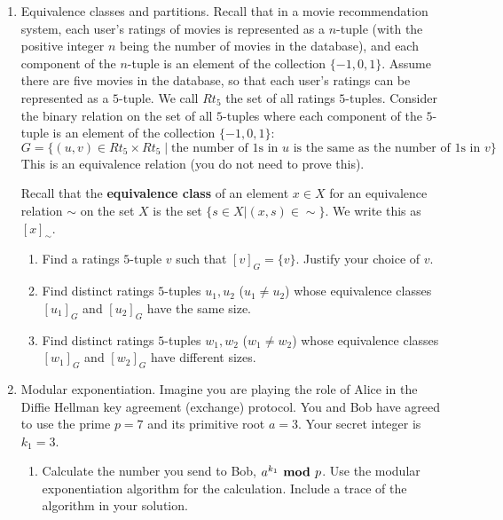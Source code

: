 \documentclass[12pt, oneside]{article}
\begin{document}
\begin{enumerate}[labelindent=0pt, leftmargin=0pt]
    \item Equivalence classes and partitions. 
    Recall that 
    in a movie recommendation system, each 
    user's ratings of movies is represented as a $n$-tuple (with the positive integer $n$ 
    being the number of movies in the database), and each component of 
    the $n$-tuple is an element of the collection $\{-1,0,1\}$. Assume there are five movies in the database, 
    so that each user's ratings
    can be represented as a $5$-tuple. We call $Rt_5$ the set of all ratings $5$-tuples.
    Consider the binary relation on the  set of all 
    $5$-tuples where each  component of the $5$-tuple is an element of the collection $\{-1,0,1\}$:
    \[
        G = \{ (u,v) \in Rt_5 \times Rt_5 \mid \text{the number of $1$s in $u$ is the same as the number of $1$s in $v$} \}
    \]
    This is an equivalence relation (you do not need to prove this).

    Recall that the {\bf equivalence class} of an element $x \in X$ for an equivalence relation $\sim$ on the set $X$ 
    is the set $\{s \in X | (x, s) \in \sim \}$. We write this as $[x]_\sim$.
    
    \begin{enumerate}
        \item Find a ratings $5$-tuple $v$ such that $[v]_{G} = \{v \}$. Justify your choice of $v$.
        \item Find distinct ratings $5$-tuples $u_1, u_2$ ($u_1 \neq u_2$) whose equivalence classes $[u_1]_{G}$ and $[u_2]_{G}$ have the same size.
        \item Find distinct ratings $5$-tuples $w_1, w_2$ ($w_1 \neq w_2$) whose equivalence classes $[w_1]_{G}$ and $[w_2]_{G}$ have different sizes.
    \end{enumerate}


    \item Modular exponentiation.
    Imagine you are playing the role of Alice in the Diffie Hellman key agreement (exchange) protocol.  
    You and Bob have agreed to use the prime $p = 7$ and its primitive root $a = 3$.
    Your secret integer is $k_1 = 3$.
        
        \begin{enumerate}
        \item  
        Calculate the number you send to Bob, 
        $a^{k_1} \textrm{\bf ~mod~} p$.  Use the modular exponentiation algorithm
        for the calculation. Include a trace of the algorithm in your solution.

        


\end{enumerate}
\end{enumerate}
\end{document}
